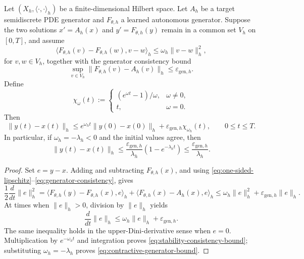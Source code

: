 \begin{theorem}\label{thm:generator-stability}
Let $(X_h,\langle\cdot,\cdot\rangle_h)$ be a finite-dimensional Hilbert space.  Let $A_h$ be a target semidiscrete PDE generator and $F_{\theta,h}$ a learned autonomous generator.  Suppose the two solutions $x'=A_h(x)$ and $y'=F_{\theta,h}(y)$ remain in a common set $V_h$ on $[0,T]$, and assume
\begin{equation}\label{eq:one-sided-lipschitz}
\langle F_{\theta,h}(v)-F_{\theta,h}(w),v-w\rangle_h\leq\omega_h\lVert v-w\rVert_h^2,
\end{equation}
for $v,w\in V_h$, together with the generator consistency bound
\begin{equation}\label{eq:generator-consistency}
\sup_{v\in V_h}\lVert F_{\theta,h}(v)-A_h(v)\rVert_h\leq\varepsilon_{\mathrm{gen},h}.
\end{equation}
Define
\begin{equation}\label{eq:chi-omega}
\chi_\omega(t):=\begin{cases}(e^{\omega t}-1)/\omega,&\omega\neq0,\\ t,&\omega=0.\end{cases}
\end{equation}
Then
\begin{equation}\label{eq:stability-consistency-bound}
\lVert y(t)-x(t)\rVert_h\leq e^{\omega_ht}\lVert y(0)-x(0)\rVert_h+\varepsilon_{\mathrm{gen},h}\chi_{\omega_h}(t),\qquad 0\leq t\leq T.
\end{equation}
In particular, if $\omega_h=-\lambda_h<0$ and the initial values agree, then
\begin{equation}\label{eq:contractive-generator-bound}
\lVert y(t)-x(t)\rVert_h\leq\frac{\varepsilon_{\mathrm{gen},h}}{\lambda_h}(1-e^{-\lambda_ht})\leq\frac{\varepsilon_{\mathrm{gen},h}}{\lambda_h}.
\end{equation}
\end{theorem}

\begin{proof}
Set $e=y-x$.  Adding and subtracting $F_{\theta,h}(x)$, and using \eqref{eq:one-sided-lipschitz}--\eqref{eq:generator-consistency}, gives
\begin{equation*}
\frac12\frac{d}{dt}\lVert e\rVert_h^2=\langle F_{\theta,h}(y)-F_{\theta,h}(x),e\rangle_h+\langle F_{\theta,h}(x)-A_h(x),e\rangle_h\leq\omega_h\lVert e\rVert_h^2+\varepsilon_{\mathrm{gen},h}\lVert e\rVert_h.
\end{equation*}
At times when $\lVert e\rVert_h>0$, division by $\lVert e\rVert_h$ yields
\begin{equation*}
\frac{d}{dt}\lVert e\rVert_h\leq\omega_h\lVert e\rVert_h+\varepsilon_{\mathrm{gen},h}.
\end{equation*}
The same inequality holds in the upper-Dini-derivative sense when $e=0$.  Multiplication by $e^{-\omega_ht}$ and integration proves \eqref{eq:stability-consistency-bound}; substituting $\omega_h=-\lambda_h$ proves \eqref{eq:contractive-generator-bound}.
\end{proof}

